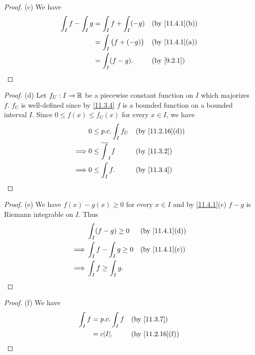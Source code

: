 \begin{proof}{(c)}
  We have
  \begin{align*}
    \int_I f - \int_I g & = \int_I f + \int_I (-g)    &  & \text{(by \cref{11.4.1}(b))} \\
                        & = \int_I \big(f + (-g)\big) &  & \text{(by \cref{11.4.1}(a))} \\
                        & = \int_I (f - g).           &  & \by{9.2.1}
  \end{align*}
\end{proof}

\begin{proof}{(d)}
  Let \(f_U : I \to \mathbb{R}\) be a piecewise constant function on \(I\) which majorizes \(f\).
  \(f_U\) is well-defined since by \cref{11.3.4} \(f\) is a bounded function on a bounded interval \(I\).
  Since \(0 \leq f(x) \leq f_U(x)\) for every \(x \in I\), we have
  \begin{align*}
             & 0 \leq p.c. \int_I f_U     &  & \text{(by \cref{11.2.16}(d))} \\
    \implies & 0 \leq \overline{\int}_I f &  & \by{11.3.2}                   \\
    \implies & 0 \leq \int_I f.           &  & \by{11.3.4}
  \end{align*}
\end{proof}

\begin{proof}{(e)}
  We have \(f(x) - g(x) \geq 0\) for every \(x \in I\) and by \cref{11.4.1}(c) \(f - g\) is Riemann integrable on \(I\).
  Thus
  \begin{align*}
             & \int_I (f - g) \geq 0      &  & \text{(by \cref{11.4.1}(d))} \\
    \implies & \int_I f - \int_I g \geq 0 &  & \text{(by \cref{11.4.1}(c))} \\
    \implies & \int_I f \geq \int_I g.
  \end{align*}
\end{proof}

\begin{proof}{(f)}
  We have
  \begin{align*}
    \int_I f & = p.c. \int_I f &  & \by{11.3.7}                   \\
             & = c \abs{I}.    &  & \text{(by \cref{11.2.16}(f))}
  \end{align*}
\end{proof}

